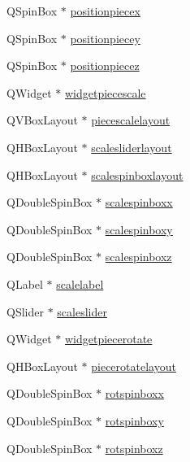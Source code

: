 \begin{DoxyCompactItemize}
\item 
Q\+Spin\+Box $\ast$ \hyperlink{class_mondock_ab93f251cb0119893cc7aadcd3ffb8eb1}{positionpiecex}
\item 
Q\+Spin\+Box $\ast$ \hyperlink{class_mondock_a82edda6549941e9c67700ed4562abba7}{positionpiecey}
\item 
Q\+Spin\+Box $\ast$ \hyperlink{class_mondock_ac4aa7f84daff43586674a324e0a69e24}{positionpiecez}
\item 
Q\+Widget $\ast$ \hyperlink{class_mondock_ac94f8cc2fda714079ee5a9ae363fe052}{widgetpiecescale}
\item 
Q\+V\+Box\+Layout $\ast$ \hyperlink{class_mondock_ae5f17873217894ff633f8dafc2907f9f}{piecescalelayout}
\item 
Q\+H\+Box\+Layout $\ast$ \hyperlink{class_mondock_a6a3248438048bf5db04e3e8b14a6fd3c}{scalesliderlayout}
\item 
Q\+H\+Box\+Layout $\ast$ \hyperlink{class_mondock_a3fdcf22d5b37219656eff1e9cf6973f8}{scalespinboxlayout}
\item 
Q\+Double\+Spin\+Box $\ast$ \hyperlink{class_mondock_a2f5f7e4641d0b15fc2c163667609fe04}{scalespinboxx}
\item 
Q\+Double\+Spin\+Box $\ast$ \hyperlink{class_mondock_a5659a916e3e6ca2e4f7b22610e903f8f}{scalespinboxy}
\item 
Q\+Double\+Spin\+Box $\ast$ \hyperlink{class_mondock_a218b1ecd2bf0e9d01622d1b46a55d460}{scalespinboxz}
\item 
Q\+Label $\ast$ \hyperlink{class_mondock_ad1002116acd630a0c97247a8459303c6}{scalelabel}
\item 
Q\+Slider $\ast$ \hyperlink{class_mondock_aeeaf93a255354e17ba515988712dd608}{scaleslider}
\item 
Q\+Widget $\ast$ \hyperlink{class_mondock_af63f72dedf5afeaf073592a02800c5bd}{widgetpiecerotate}
\item 
Q\+H\+Box\+Layout $\ast$ \hyperlink{class_mondock_a0a64de60226deeaa13c05d357ec20cef}{piecerotatelayout}
\item 
Q\+Double\+Spin\+Box $\ast$ \hyperlink{class_mondock_a4e20e77ae6e753019ae1e73b8d11290d}{rotspinboxx}
\item 
Q\+Double\+Spin\+Box $\ast$ \hyperlink{class_mondock_aff7adb8b724a2d8b097834487864f4ed}{rotspinboxy}
\item 
Q\+Double\+Spin\+Box $\ast$ \hyperlink{class_mondock_a0e78f599b45d731f0882942891bfbea2}{rotspinboxz}
\end{DoxyCompactItemize}


